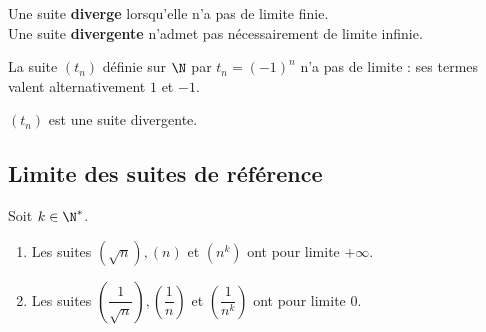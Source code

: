 \documentclass[a4paper,11pt,cours]{nsi} %
\begin{document}
\begin{remarque}[]
    Une suite \textbf{diverge} lorsqu'elle n'a pas de limite finie.\\
    Une suite \textbf{divergente} n'admet pas nécessairement de limite infinie.
\end{remarque}


\begin{exemple}[]
    La suite $(t_n)$ définie sur $\N$ par $t_n=(-1)^n$ n'a pas de limite : ses termes valent alternativement $1$ et $-1$.
    \begin{center}
        \def\xmin{-1} \def\ymin{-2}\def\xmax{11}\def\ymax{2}
    \end{center}
    $(t_n)$ est une suite divergente.
\end{exemple}


\newpage

\subsection*{Limite des suites de référence}
\begin{propriete}[]
    Soit $k\in\N^*$.
    \begin{enumerate}[label=\textbullet]
        \item Les suites $(\sqrt{n}), (n)$ et $(n^k)$ ont pour limite $+\infty$.
        \item Les suites $\left(\dfrac{1}{\sqrt{n}}\right), \left(\dfrac{1}{n}\right) $ et $\left(\dfrac{1}{n^k}\right)$ ont pour limite $0$.
    \end{enumerate}
\end{propriete}
\end{document}
